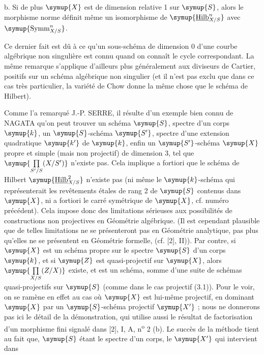 \medskip
\noindent b. Si de plus $\symup{X}$ est de dimension relative 1 sur $\symup{S}$, alors le
morphisme norme définit même un isomorphisme de
$\symup{\underline{\operatorname{Hilb}}^n_{X/S}}$ avec $\symup{\operatorname{Symm}^n_{X/S}}$.

Ce dernier fait est dû à ce qu'un sous-schéma de dimension 0 d'une courbe
algébrique non singulière est connu quand on connaît le cycle correspondant. La
même remarque s'applique d'ailleurs plus généralement aux diviseurs de Cartier,
positifs sur un schéma algébrique non singulier (et il n'est pas exclu que dans
ce cas très particulier, la variété de Chow donne la même chose que le schéma
de Hilbert).


Comme l'a remarqué J.-P. SERRE, il résulte d'un exemple bien connu de NAGATA
qu'on peut trouver un schéma $\symup{S}$, spectre d'un corps $\symup{k}$, un $\symup{S}$-schéma $\symup{S'}$,
spectre d'une extension quadratique $\symup{k'}$ de $\symup{k}$, enfin un $\symup{S'}$-schéma $\symup{X}$
propre et simple (mais non projectif) de dimension 3, tel que
$\symup{\prod\limits_{S'/S}(X/S')}$ n'existe pas. Cela implique a fortiori que le schéma de
Hilbert $\symup{\underline{\operatorname{Hilb}}^2_{X/S}}$ n'existe pas (ni même le $\symup{k}$-schéma qui
représenterait les revêtements étales de rang 2 de $\symup{S}$ contenus dans $\symup{X}$, ni a
fortiori le carré symétrique de $\symup{X}$, cf. numéro précédent). Cela impose donc
des limitations sérieuses aux possibilités de constructions non projectives en
Géométrie algébrique. (Il est cependant plausible que de telles limitations ne
se présenteront pas en Géométrie analytique, pas plus qu'elles ne se présentent
en Géométrie formelle, (cf. [2], II)). Par contre, si $\symup{X}$ est un schéma propre
sur le spectre $\symup{S}$ d'un corps $\symup{k}$, et si $\symup{Z}$ est quasi-projectif sur $\symup{X}$, alors
$\symup{\prod\limits_{X/S}(Z/X)}$ existe, et est un schéma, somme d'une suite de schémas
quasi-projectifs sur $\symup{S}$ (comme dans le cas projectif (3.1)). Pour le voir, on
se ramène en effet au cas où $\symup{X}$ est lui-même projectif, en dominant $\symup{X}$ par un
$\symup{S}$-schéma projectif $\symup{X'}$ ; nous ne donnerons pas ici le détail de la
démonstration, qui utilise aussi le résultat de factorisation d'un morphisme
fini signalé dans [2], I, A, n\textsuperscript{o} 2 (b). Le succès de la méthode
tient au fait que, $\symup{S}$ étant le spectre d'un corps, le $\symup{X'}$ qui intervient dans
